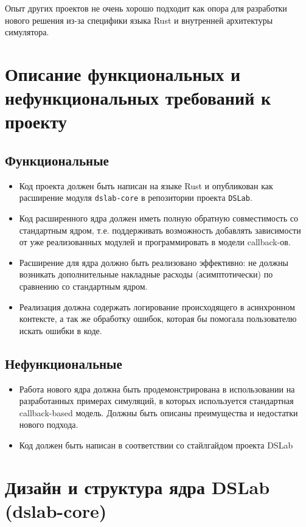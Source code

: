 Опыт других проектов не очень хорошо подходит как опора для разработки нового решения из-за специфики языка Rust и внутренней архитектуры симулятора.


\section{Описание функциональных и нефункциональных требований к проекту}

\subsection{Функциональные}
\begin{itemize}
    \item Код проекта должен быть написан на языке Rust и опубликован как расширение модуля \texttt{dslab-core} в репозитории проекта \texttt{DSLab}\cite{dslab-repo}.
    \item Код расширенного ядра должен иметь полную обратную совместимость со стандартным ядром, т.е. поддерживать возможность добавлять зависимости от уже реализованных модулей и программировать в модели callback-ов.
    \item Расширение для ядра должно быть реализовано эффективно: не должны возникать дополнительные накладные расходы (асимптотически) по сравнению со стандартным ядром.
    \item Реализация должна содержать логирование происходящего в асинхронном контексте, а так же обработку ошибок, которая бы помогала пользователю искать ошибки в коде. 
\end{itemize}

\subsection{Нефункциональные}
\begin{itemize}
    \item Работа нового ядра должна быть продемонстрирована в использовании на разработанных примерах симуляций, в которых используется стандартная callback-based модель. Должны быть описаны преимущества и недостатки нового подхода.
    \item Код должен быть написан в соответствии со стайлгайдом проекта DSLab
\end{itemize}




\section{Дизайн и структура ядра DSLab (dslab-core)} \label{dslab-core-design}

